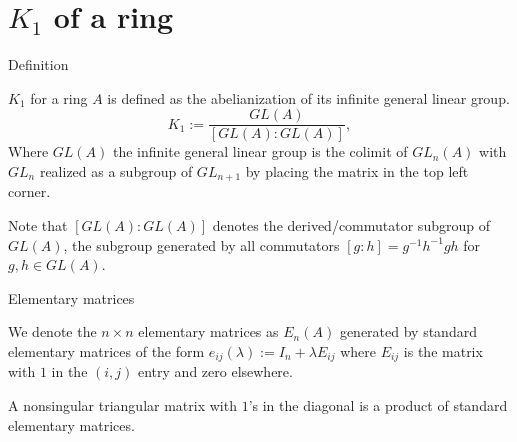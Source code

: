 \documentclass{beamer}
\begin{document}
\section{$K_1$ of a ring}
\begin{frame}{Definition}
		\begin{definition} $K_1$ for a ring $A$ is defined as the abelianization of its infinite general linear group.
		$$K_1:= \frac{GL(A)}{[GL(A):GL(A)]},$$
		Where $GL(A)$ the infinite general linear group is the colimit of $GL_n(A)$ with $GL_{n}$ realized as a subgroup of $GL_{n+1}$ by placing the matrix in the top left corner. 
	\end{definition}
	Note that $[GL(A):GL(A)]$ denotes the derived/commutator subgroup of $GL(A)$, the subgroup generated by all commutators $[g:h]=g^{-1}h^{-1}gh$ for $g,h \in GL(A)$.
\end{frame}
\begin{frame}{Elementary matrices}
	\begin{definition}
		We denote the $n\times n$ elementary matrices as $E_n(A)$ generated by standard elementary matrices of the form $e_{ij}(\lambda) := I_{n}+ \lambda E_{ij} $ where $E_{ij}$ is the matrix with $1$ in the $(i,j)$ entry and zero elsewhere.
	\end{definition}
	\begin{lemma}\label{diag1andprodelementary}
		A nonsingular triangular matrix with $1$'s in the diagonal is a product of standard elementary matrices.
	\end{lemma}
\end{frame}
\end{document}
